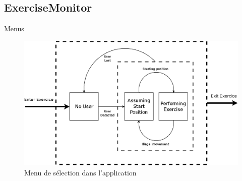 \subsection{ExerciseMonitor}
\begin{frame}{Menus}
\begin{figure}
\begin{center}
\includegraphics[width=0.8\linewidth]{../images/exercise_monitor}
\caption{Menu de sélection dans l'application}
\end{center}
\end{figure}
\end{frame}

